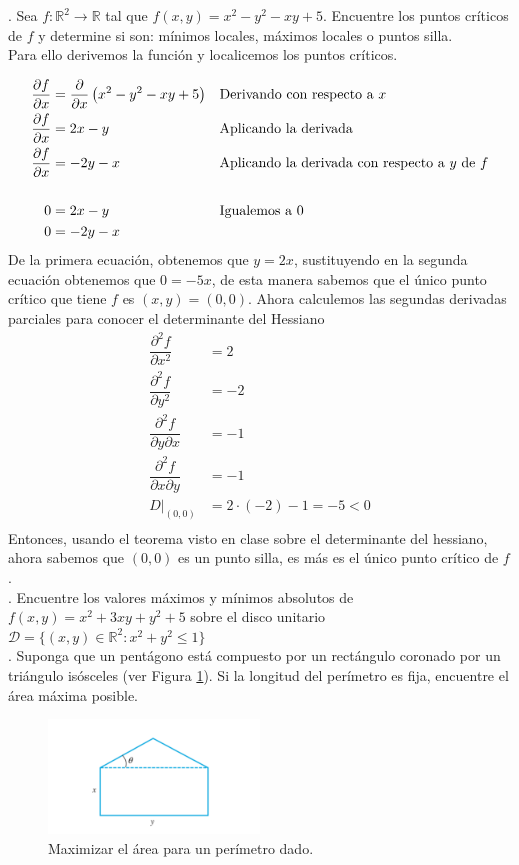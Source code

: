 \documentclass[letterpaper]{article}
\renewcommand{\d}{\partial}
\renewcommand{\*}{\cdot}
\theoremstyle{definition}
\begin{document}
. Sea $f: \mathbb{R}^2 \longrightarrow \mathbb{R}$ tal que  $f(x,y) = x^2 - y^2 - xy + 5$. Encuentre los puntos críticos de $f$ y determine si son: mínimos locales, máximos locales o puntos silla.\\
Para ello derivemos la función y localicemos los puntos críticos.

\begin{align*}
	\dfrac{\d f}{\d x} &= \dfrac{\d }{\d x}\left( x^2 - y^2 - xy + 5 \right) &&\text{Derivando con respecto a }x\\
	\dfrac{\d f}{\d x} &= 2x-y &&\text{Aplicando la derivada}\\
	\dfrac{\d f}{\d x} &= -2y-x &&\text{Aplicando la derivada con respecto a $ y $ de }f\\
	\\
	0 &= 2x-y &&\text{Igualemos a }0\\
	0 &= -2y - x &&\text{ }\\
\end{align*}
De la primera ecuación, obtenemos que $ y = 2x $, sustituyendo en la segunda ecuación obtenemos que $ 0 = -5x $, de esta manera sabemos que el único punto crítico que tiene $ f $ es $ (x,y) = (0,0) $. Ahora calculemos las segundas derivadas parciales para conocer el determinante del Hessiano
\begin{align*}
	\dfrac{\d^2 f}{\d x^2} &= 2\\
	\dfrac{\d^2 f}{\d y^2} &= -2\\
	\dfrac{\d^2 f}{\d y \d x} &= -1\\
	\dfrac{\d^2 f}{\d x \d y} &= -1\\
	D\Bigr|_{(0,0)} &= 2 \* (-2) - 1 = -5 < 0\\
\end{align*}
Entonces, usando el teorema visto en clase sobre el determinante del hessiano, ahora sabemos que $ (0,0) $ es un punto silla, es más es el único punto crítico de $ f $.\\


. Encuentre los valores máximos y mínimos absolutos de $f(x,y) = x^2 + 3xy + y^2 + 5$ sobre el disco unitario $\mathcal{D} = \{(x,y) \in \mathbb{R}^2 : x^2 + y^2 \leq 1 \}$\\

. Suponga que un pentágono está compuesto por un rectángulo coronado por un triángulo isósceles (ver Figura \ref{fig:1}). Si la longitud del perímetro es fija, encuentre el área máxima posible.

\begin{figure}[h]
    \centering
    \includegraphics[width=0.5\textwidth]{img/figT}
    \caption{Maximizar el área para un perímetro dado.}
    \label{fig:1}
\end{figure}
\end{document}
